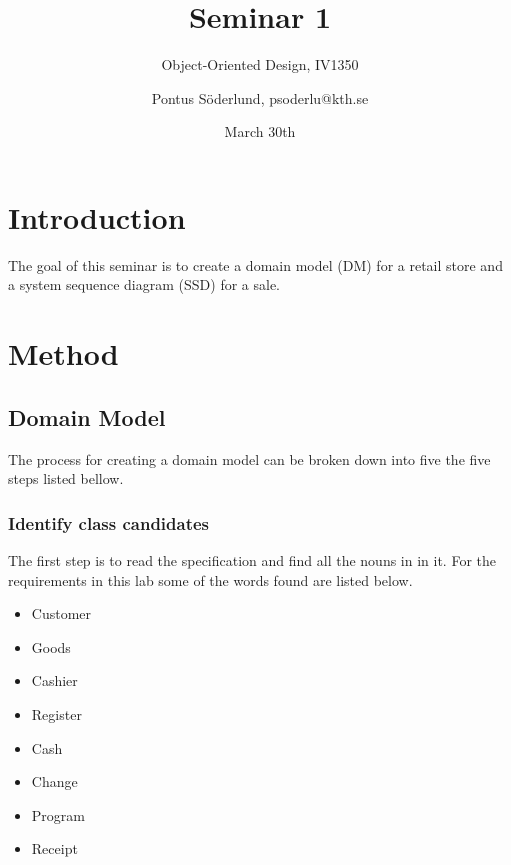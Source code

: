 \documentclass[a4paper]{scrreprt}
\title{Seminar 1}
\subtitle{Object-Oriented Design, IV1350}
\author{Pontus Söderlund, psoderlu@kth.se}
\date{March 30th}
\begin{document}
\maketitle

\tableofcontents %

\chapter{Introduction}
    The goal of this seminar is to create a domain model (DM) for a retail store
    and a system sequence diagram (SSD) for a sale.

\chapter{Method}
    
    \section{Domain Model}
        The process for creating a domain model can be broken down into five the 
        five steps listed bellow.

        \subsection{Identify class candidates}
            The first step is to read the specification and find all the nouns in
            in it. For the requirements in this lab some of the words found are
            listed below.

            \begin{itemize}
                \item Customer
                \item Goods
                \item Cashier
                \item Register
                \item Cash
                \item Change
                \item Program
                \item Receipt
            \end{itemize}
\end{document}
